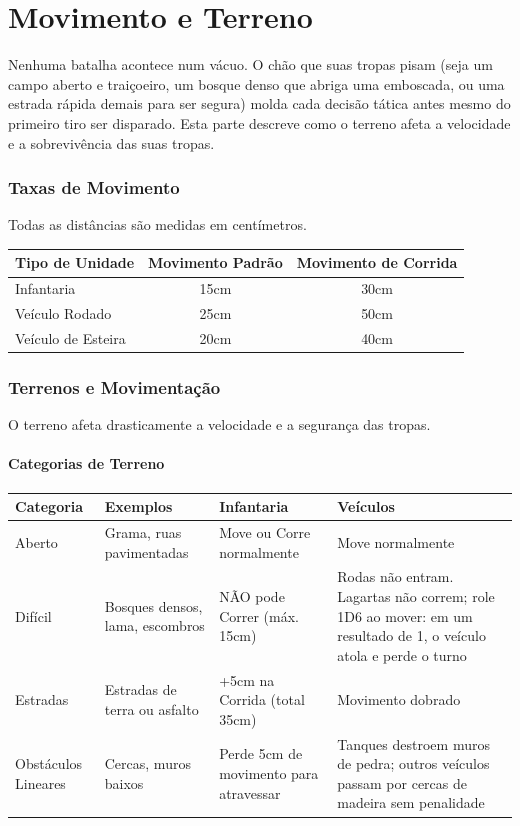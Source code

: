 \part{Movimento e Terreno}

Nenhuma batalha acontece num vácuo. O chão que suas tropas pisam (seja um campo aberto e traiçoeiro, um bosque denso que abriga uma emboscada, ou uma estrada rápida demais para ser segura) molda cada decisão tática antes mesmo do primeiro tiro ser disparado. Esta parte descreve como o terreno afeta a velocidade e a sobrevivência das suas tropas.

\section{Taxas de Movimento}

Todas as distâncias são medidas em centímetros.

\begin{center}
\begin{tabular}{lcc}
\toprule
Tipo de Unidade & Movimento Padrão & Movimento de Corrida \\
\midrule
Infantaria & 15cm & 30cm \\
Veículo Rodado & 25cm & 50cm \\
Veículo de Esteira & 20cm & 40cm \\
\bottomrule
\end{tabular}
\end{center}

\section{Terrenos e Movimentação}

O terreno afeta drasticamente a velocidade e a segurança das tropas.

\subsection{Categorias de Terreno}

\begin{center}
\begin{tabular}{p{2.6cm}p{3.4cm}p{4.2cm}p{4.4cm}}
\toprule
Categoria & Exemplos & Infantaria & Veículos \\
\midrule
Aberto & Grama, ruas pavimentadas & Move ou Corre normalmente & Move normalmente \\
Difícil & Bosques densos, lama, escombros & NÃO pode Correr (máx. 15cm) & Rodas não entram. Lagartas não correm; role 1D6 ao mover: em um resultado de 1, o veículo atola e perde o turno \\
Estradas & Estradas de terra ou asfalto & +5cm na Corrida (total 35cm) & Movimento dobrado \\
Obstáculos Lineares & Cercas, muros baixos & Perde 5cm de movimento para atravessar & Tanques destroem muros de pedra; outros veículos passam por cercas de madeira sem penalidade \\
\bottomrule
\end{tabular}
\end{center}


